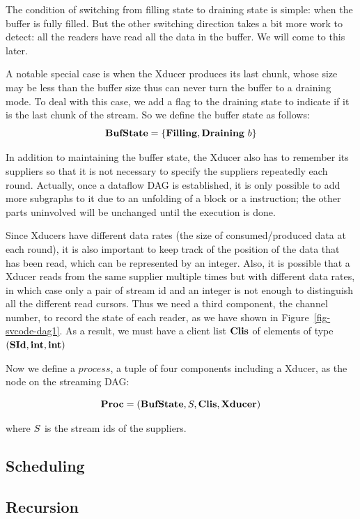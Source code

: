The condition of switching from filling state to draining state is simple: when the buffer is fully filled. 
But the other switching direction takes a bit more work to detect: all the readers have read all the data in the buffer. We will come to this later.

A notable special case is when the Xducer produces its last chunk, whose size may be less than the buffer size thus can never turn the buffer to a draining mode.
To deal with this case, we add a flag to the draining state to indicate if it is the last chunk of the stream. 
So we define the buffer state as follows:
$$\bufst = \{\*{Filling}, \*{Draining} \ b \} $$


In addition to maintaining the buffer state, the Xducer also has to remember its suppliers so that it is not necessary to specify the suppliers repeatedly each round. 
Actually, once a dataflow DAG is established, it is only possible to add more subgraphs to it due to an unfolding of a \wc block or a \sc instruction; the other parts uninvolved will be unchanged until the execution is done.


Since Xducers have different data rates (the size of consumed/produced data at each round), it is also important to keep track of the position of the data that has been read, which can be represented by an integer.
Also, it is possible that a Xducer reads from the same supplier multiple times but with different data rates, in which case only a pair of stream id and an integer is not enough to distinguish all the different read cursors. 
Thus we need a third component, the channel number, to record the state of each reader, as we have shown in Figure~\ref{fig-svcode-dag1}.
As a result, we must have a client list $\clis$ of elements of type $(\SId, \int, \int) $

Now we define a $process$, a tuple of four components including a Xducer, as the node on the streaming DAG:

$$ \proc  =  (\bufst, \S, \clis, \xducer) $$

where $\S$ is the stream ids of the suppliers. 



\subsection{Scheduling}


\subsection{Recursion}

